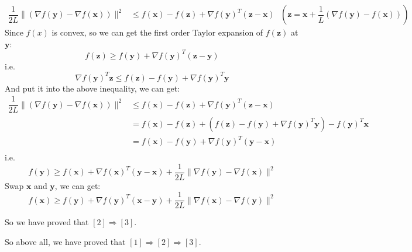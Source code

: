 \begin{itemize}
\begin{align*}
    \dfrac{1}{2L}\|(\nabla f(\mathbf{y})-\nabla f(\mathbf{x}))\|^2 &\leq f(\mathbf{x}) - f(\mathbf{z}) + \nabla f(\mathbf{y})^T(\mathbf{z}-\mathbf{x}) \text{\ \ \ \ \ \ \ $\left(\mathbf{z}=\mathbf{x}+\dfrac{1}{L}(\nabla f(\mathbf{y})-f(\mathbf{x}))\right)$}
\end{align*}
Since $f(x)$ is convex, so we can get the first order Taylor expansion of $f(\mathbf{z})$ at $\mathbf{y}$:
$$f(\mathbf{z}) \geq f(\mathbf{y})+\nabla f(\mathbf{y})^T(\mathbf{z}-\mathbf{y})$$
i.e.
$$\nabla f(\mathbf{y})^T\mathbf{z}\leq f(\mathbf{z})-f(\mathbf{y})+\nabla f(\mathbf{y})^T\mathbf{y}$$
And put it into the above inequality, we can get:
\begin{align*}
    \dfrac{1}{2L}\|(\nabla f(\mathbf{y})-\nabla f(\mathbf{x}))\|^2 &\leq f(\mathbf{x}) - f(\mathbf{z}) + \nabla f(\mathbf{y})^T(\mathbf{z}-\mathbf{x}) \\
    &= f(\mathbf{x}) - f(\mathbf{z}) + \left(f(\mathbf{z})-f(\mathbf{y})+\nabla f(\mathbf{y})^T\mathbf{y}\right) -f(\mathbf{y})^T\mathbf{x} \\
    &= f(\mathbf{x}) - f(\mathbf{y}) + \nabla f(\mathbf{y})^T(\mathbf{y} - \mathbf{x}) \\
\end{align*}
i.e.
$$f(\mathbf{y}) \geq f(\mathbf{x})+\nabla f(\mathbf{x})^T(\mathbf{y}-\mathbf{x})+\frac{1}{2 L}\|\nabla f(\mathbf{y})-\nabla f(\mathbf{x})\|^2$$
Swap $\mathbf{x}$ and $\mathbf{y}$, we can get:
$$f(\mathbf{x}) \geq f(\mathbf{y})+\nabla f(\mathbf{y})^T(\mathbf{x}-\mathbf{y})+\frac{1}{2 L}\|\nabla f(\mathbf{x})-\nabla f(\mathbf{y})\|^2$$
    
So we have proved that $[2] \Rightarrow[3]$.

\end{itemize}

So above all, we have proved that $[1] \Rightarrow[2] \Rightarrow[3]$.

\newpage